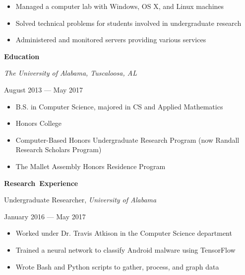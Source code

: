 \documentclass[11pt]{article}
\begin{document}
\begin{itemize}
  \item Managed a computer lab with Windows, OS X, and Linux machines
  \item Solved technical problems for students involved in undergraduate research
  \item Administered and monitored servers providing various services
\end{itemize}

\vspace{0.6em}
\hbox{\large \textbf{Education}}

\begin{minipage}[t]{0.65\textwidth}
\flushleft
\textit{The University of Alabama, Tuscaloosa, AL}\\
\end{minipage}
\begin{minipage}[t]{0.30\textwidth}
\flushright
August 2013 --- May 2017\\
\end{minipage}

\begin{itemize}
  \item B.S. in Computer Science, majored in CS and Applied Mathematics
  \item Honors College
  \item Computer-Based Honors Undergraduate Research Program (now Randall Research Scholars Program)
  \item The Mallet Assembly Honors Residence Program
\end{itemize}

\vspace{0.6em}
\hbox{\large \textbf{Research Experience}}

\vspace{0.4em}
\begin{minipage}[t]{0.65\textwidth}
\flushleft
Undergraduate Researcher, \textit{University of Alabama}\\
\end{minipage}
\begin{minipage}[t]{0.30\textwidth}
\flushright
January 2016 --- May 2017\\
\end{minipage}

\begin{itemize}
  \item Worked under Dr. Travis Atkison in the Computer Science department
  \item Trained a neural network to classify Android malware using TensorFlow
  \item Wrote Bash and Python scripts to gather, process, and graph data
\end{itemize}
\end{document}
